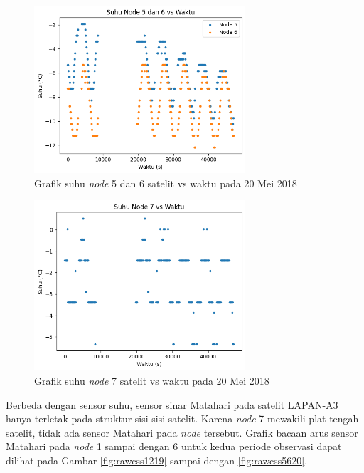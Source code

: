 \begin{figure}[H]
\setlength{}
\begin{center}
\includegraphics[width=0.7\textwidth]{fig/raw_node56_temp_2018-05-20.png}
	\caption{Grafik suhu \textit{node} 5 dan 6 satelit vs waktu pada 20 Mei 2018}
\label{fig:rawtemp5620}
\end{center}
\end{figure}

\begin{figure}[H]
\setlength{}
\begin{center}
\includegraphics[width=0.7\textwidth]{fig/raw_node7_temp_2018-05-20.png}
	\caption{Grafik suhu \textit{node} 7 satelit vs waktu pada 20 Mei 2018}
\label{fig:rawtemp720}
\end{center}
\end{figure}

Berbeda dengan sensor suhu, sensor sinar Matahari pada satelit LAPAN-A3 hanya
terletak pada struktur sisi-sisi satelit. Karena \textit{node} 7 mewakili plat
tengah satelit, tidak ada sensor Matahari pada \textit{node} tersebut. Grafik
bacaan arus sensor Matahari pada \textit{node} 1 sampai dengan 6 untuk kedua
periode observasi dapat dilihat pada Gambar \ref{fig:rawcss1219} sampai dengan
\ref{fig:rawcss5620}.

